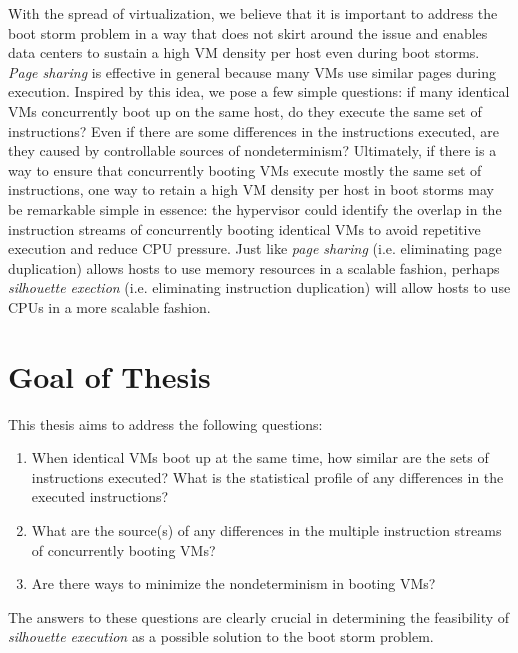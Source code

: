 With the spread of virtualization, we believe that it is important to address the
boot storm problem in a way that does not skirt around the issue
and enables data centers to sustain a high VM density per host even
during boot storms. {\em Page sharing} is effective
in general because many VMs use similar pages during execution.
Inspired by this idea, we pose a few simple questions: 
if many identical VMs concurrently boot up on the same host,
do they execute the same set of instructions? Even if there are
some differences in the instructions executed, are they caused by
controllable sources of nondeterminism? Ultimately, if there is a way
to ensure that concurrently booting VMs execute mostly the same set of instructions,
 one way to retain a high VM density 
per host in boot storms may be remarkable simple in essence:
the hypervisor could identify the overlap in the instruction streams of concurrently
booting identical VMs to avoid repetitive execution and reduce
CPU pressure. Just like {\em page sharing} (i.e. eliminating page
duplication) allows hosts to use memory resources in a scalable fashion,
perhaps {\em silhouette exection} (i.e. eliminating
instruction duplication) will allow hosts
to use CPUs in a more scalable fashion.

\section{Goal of Thesis}
This thesis aims to address the following questions:

\begin{enumerate}

\item When identical VMs boot up at the same time, how similar
are the sets of instructions executed? What is the statistical
profile of any differences in the executed instructions?

\item What are the source(s) of any differences in
the multiple instruction streams of concurrently booting VMs?

\item Are there ways to minimize the nondeterminism in
booting VMs?

\end{enumerate}

The answers to these questions are clearly crucial in determining
the feasibility of \emph{silhouette execution} as a possible solution
to the boot storm problem. 

